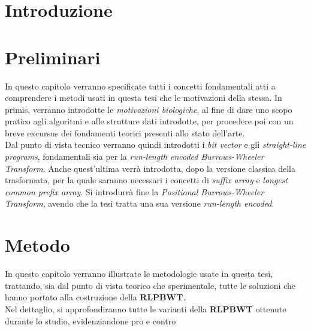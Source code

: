 \documentclass[a4paper,12pt, oneside]{book}
\begin{document}
\chapter{Introduzione}
\chapter{Preliminari}
In questo capitolo verranno specificate tutti i concetti fondamentali atti a
comprendere i metodi usati in questa tesi che le motivazioni della stessa. In
primis, verranno introdotte le \textit{motivazioni biologiche}, al fine di dare
uno scopo pratico agli algoritmi e alle strutture dati introdotte, per procedere
poi con un breve excursus dei fondamenti teorici presenti allo stato
dell'arte.\\
Dal punto di vista tecnico verranno quindi introdotti i \textit{bit vector} e
gli \textit{straight-line programs}, fondamentali sia per la \textit{run-length
  encoded Burrows-Wheeler Transform}. Anche quest'ultima verrà introdotta, dopo
la versione classica della trasformata, per la quale saranno necessari i
concetti di \textit{suffix array} e \textit{longest common prefix array}. Si
introdurrà fine la \textit{Positional Burrows-Wheeler Transform}, avendo che la
tesi tratta una sua versione \textit{run-length encoded}.














\chapter{Metodo}
In questo capitolo verranno illustrate le metodologie usate in questa tesi,
trattando, sia dal punto di vista teorico che sperimentale, tutte le soluzioni
che hanno portato alla costruzione della \textbf{RLPBWT}.\\
Nel dettaglio,
si approfondiranno tutte le varianti della \textbf{RLPBWT} ottenute durante lo
studio, evidenziandone pro e contro




\end{document}
